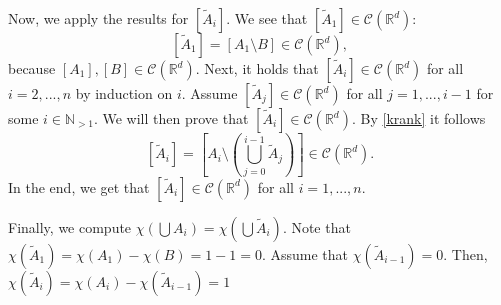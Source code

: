 \documentclass{article}
\begin{document}
Now, we apply the results for $[\tilde A_i]$. We see that $[\tilde A_1] \in \mathcal C(\mathbb R^d)$:
$$
    [\tilde A_1] = [A_1 \setminus B] \in \mathcal C(\mathbb R^d),
$$
because $[A_1], [B] \in \mathcal C(\mathbb R^d)$. Next, it holds that $[\tilde A_i] \in \mathcal C(\mathbb R^d)$ for all $i=2,...,n$ by induction on $i$. Assume $[\tilde A_{j}] \in \mathcal C(\mathbb R^d)$ for all $j=1,...,i-1$ for some $i \in \mathbb N_{> 1}$. We will then prove that $[\tilde A_{i}] \in \mathcal C(\mathbb R^d)$. By \eqref{krank} it follows
$$
    [\tilde A_i] = [A_i \setminus \left(\bigcup^{i-1}_{j=0}\tilde A_j\right)] \in \mathcal C(\mathbb R^d).
$$
In the end, we get that $[\tilde A_i] \in \mathcal C(\mathbb R^d)$ for all $i=1,...,n$.

Finally, we compute $\chi(\bigcup A_i) = \chi(\bigcup \tilde A_i)$. Note that $\chi(\tilde A_1) = \chi(A_1) - \chi(B) = 1 - 1 = 0$. Assume that $\chi(\tilde A_{i-1}) = 0$. Then, $\chi(\tilde A_i) = \chi(A_i) - \chi(\tilde A_{i-1}) = 1 $
\fi
\end{document}
